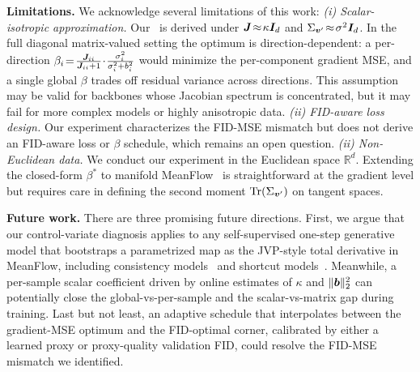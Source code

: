 \noindent\textbf{Limitations.} We acknowledge several limitations of this work: \emph{(i) Scalar-isotropic approximation.} Our~ is derived under ${\bm{J}}\!\approx\!\kappa{\bm{I}}_{d}$ and $\Sigma_{{\bm{v}}^{\prime}}\!\approx\!\sigma^{2}{\bm{I}}_{d}$. In the full diagonal matrix-valued setting the optimum is direction-dependent: a per-direction $\beta_{i}\!=\!\frac{{\bm{J}}_{ii}}{{\bm{J}}_{ii}+1}\!\cdot\!\frac{\sigma_{i}^{2}}{\sigma_{i}^{2}+b_{i}^{2}}$ would minimize the per-component gradient MSE, and a single global $\beta$ trades off residual variance across directions. This assumption may be valid for backbones whose Jacobian spectrum is concentrated, but it may fail for more complex models or highly anisotropic data. \emph{(ii) FID-aware loss design.} Our experiment characterizes the FID-MSE mismatch but does not derive an FID-aware loss or $\beta$ schedule, which remains an open question. \emph{(ii) Non-Euclidean data.} We conduct our experiment in the Euclidean space $\mathbb{R}^{d}$. Extending the closed-form $\beta^{\ast}$ to manifold MeanFlow~\cite{woo2026riemannianmeanflow} is straightforward at the gradient level but requires care in defining the second moment $\operatorname{Tr}(\Sigma_{{\bm{v}}^{\prime}})$ on tangent spaces.

\noindent\textbf{Future work.} There are three promising future directions. First, we argue that our control-variate diagnosis applies to any self-supervised one-step generative model that bootstraps a parametrized map as the JVP-style total derivative in MeanFlow, including consistency models~\cite{song2023consistencymodels} and shortcut models~\cite{frans2025stepdiffusionshortcutmodels}. Meanwhile, a per-sample scalar coefficient driven by online estimates of $\kappa$ and $\|{\bm{b}}\|_{2}^{2}$ can potentially close the global-vs-per-sample and the scalar-vs-matrix gap during training. Last but not least, an adaptive schedule that interpolates between the gradient-MSE optimum and the FID-optimal corner, calibrated by either a learned proxy or proxy-quality validation FID, could resolve the FID-MSE mismatch we identified.
